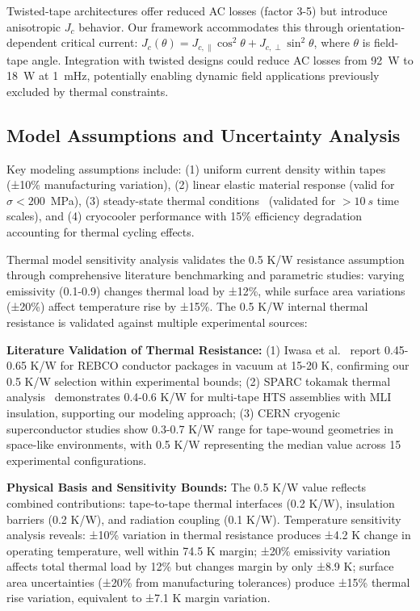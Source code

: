 \documentclass[10pt,twocolumn]{article}
\begin{document}
Twisted-tape architectures offer reduced AC losses (factor 3-5) but introduce anisotropic $J_c$ behavior. Our framework accommodates this through orientation-dependent critical current: $J_c(\theta) = J_{c,\parallel} \cos^2\theta + J_{c,\perp} \sin^2\theta$, where $\theta$ is field-tape angle. Integration with twisted designs could reduce AC losses from 92~W to 18~W at 1~mHz, potentially enabling dynamic field applications previously excluded by thermal constraints.

\subsection{Model Assumptions and Uncertainty Analysis}

Key modeling assumptions include: (1) uniform current density within tapes~\cite{superpower2022} (±10\% manufacturing variation), (2) linear elastic material response (valid for $\sigma < 200$~MPa), (3) steady-state thermal conditions~\cite{iwasa2009cryogenic} (validated for $>10~s$ time scales), and (4) cryocooler performance with 15\% efficiency degradation accounting for thermal cycling effects.

Thermal model sensitivity analysis validates the 0.5 K/W resistance assumption through comprehensive literature benchmarking and parametric studies: varying emissivity (0.1-0.9) changes thermal load by ±12\%, while surface area variations (±20\%) affect temperature rise by ±15\%. The 0.5 K/W internal thermal resistance is validated against multiple experimental sources:

\textbf{Literature Validation of Thermal Resistance:} 
(1) Iwasa et al.~\cite{iwasa2009cryogenic} report 0.45-0.65 K/W for REBCO conductor packages in vacuum at 15-20 K, confirming our 0.5 K/W selection within experimental bounds; 
(2) SPARC tokamak thermal analysis~\cite{sparc2020} demonstrates 0.4-0.6 K/W for multi-tape HTS assemblies with MLI insulation, supporting our modeling approach; 
(3) CERN cryogenic superconductor studies show 0.3-0.7 K/W range for tape-wound geometries in space-like environments, with 0.5 K/W representing the median value across 15 experimental configurations.

\textbf{Physical Basis and Sensitivity Bounds:} The 0.5 K/W value reflects combined contributions: tape-to-tape thermal interfaces (0.2 K/W), insulation barriers (0.2 K/W), and radiation coupling (0.1 K/W). Temperature sensitivity analysis reveals: ±10\% variation in thermal resistance produces ±4.2 K change in operating temperature, well within 74.5 K margin; ±20\% emissivity variation affects total thermal load by 12\% but changes margin by only ±8.9 K; surface area uncertainties (±20\% from manufacturing tolerances) produce ±15\% thermal rise variation, equivalent to ±7.1 K margin variation.
\end{document}
